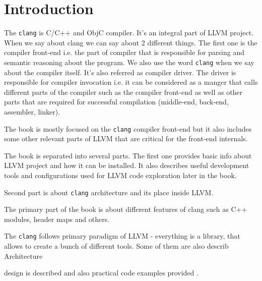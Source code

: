 \chapter{Introduction}

The \texttt{clang} is C/C++ and ObjC compiler. It's an
integral part of LLVM 
project. When we say about clang we can say about 2 different
things. The first one is the compiler front-end i.e. the part of
compiler that is responsible for parsing and semantic reasoning about
the program. We also use the word \texttt{clang} when we say
about the compiler itself. It's also referred as compiler driver. The
driver is responsible for compiler invocation i.e. it can be
considered as a manger that calls different parts of the
compiler such as the compiler
front-end as well as other parts that are required for successful
compilation (middle-end, back-end, assembler, linker).

The book is mostly focused on the \texttt{clang} compiler
front-end but it also includes some other relevant parts of
LLVM that are critical for the front-end internals.

The book is separated into several parts. The first one provides basic
info about LLVM project and how it can be installed. It also describes
useful development tools and configurations used for LLVM code
exploration later in the book.

Second part is about \texttt{clang} architecture and its
place inside LLVM.

The primary part of the book is about different features of clang such as C++
modules, header maps and others.

The \texttt{clang} follows primary paradigm of LLVM -
everything is a library, that allows to create a bunch of different
tools. Some of them are also describ
Architecture

design is described and also practical code examples provided
\cite{github:clangbook_src}.

